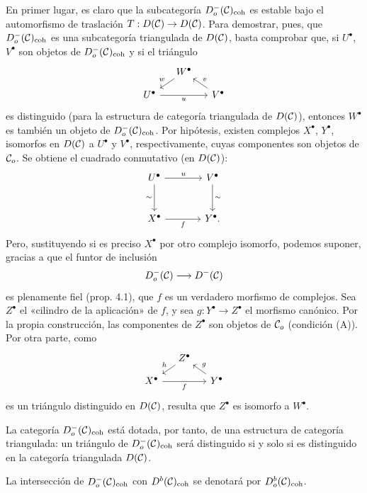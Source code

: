 En primer lugar, es claro que la subcategoría $D_o^-(\mathcal C)_{\mathrm{coh}}$ es estable bajo el automorfismo de traslación $T:D(\mathcal C)\to D(\mathcal C)$. Para demostrar, pues, que $D_o^-(\mathcal C)_{\mathrm{coh}}$ es una subcategoría triangulada de $D(\mathcal C)$, basta comprobar que, si $U^\bullet$, $V^\bullet$ son objetos de $D_o^-(\mathcal C)_{\mathrm{coh}}$ y si el triángulo
\[
\begin{tikzcd}[column sep=small,row sep=small]
& W^\bullet \arrow[dl,"w"']\\
U^\bullet \arrow[rr,"u"']&& V^\bullet \arrow[ul,"v"']
\end{tikzcd}
\]
es distinguido (para la estructura de categoría triangulada de $D(\mathcal C)$), entonces $W^\bullet$ es también un objeto de $D_o^-(\mathcal C)_{\mathrm{coh}}$. Por hipótesis, existen complejos $X^\bullet$, $Y^\bullet$, isomorfos en $D(\mathcal C)$ a $U^\bullet$ y $V^\bullet$, respectivamente, cuyas componentes son objetos de $\mathcal C_o$. Se obtiene el cuadrado conmutativo (en $D(\mathcal C)$):
\[
\begin{tikzcd}[column sep=large,row sep=large]
U^\bullet \arrow[r,"u"] \arrow[d,"\sim"']&V^\bullet \arrow[d,"\sim"]\\
X^\bullet \arrow[r,"f"']&Y^\bullet .
\end{tikzcd}
\]
Pero, sustituyendo si es preciso $X^\bullet$ por otro complejo isomorfo, podemos suponer, gracias a que el funtor de inclusión
\[
D_o^-(\mathcal C)\longrightarrow D^-(\mathcal C)
\]
es plenamente fiel (prop. 4.1), que $f$ es un verdadero morfismo de complejos. Sea $Z^\bullet$ el «cilindro de la aplicación» de $f$, y sea $g:Y^\bullet\to Z^\bullet$ el morfismo canónico. Por la propia construcción, las componentes de $Z^\bullet$ son objetos de $\mathcal C_o$ (condición (A)). Por otra parte, como
\[
\begin{tikzcd}[column sep=small,row sep=small]
&Z^\bullet \arrow[dl,"h"']\\
X^\bullet \arrow[rr,"f"']&&Y^\bullet \arrow[ul,"g"']
\end{tikzcd}
\]
es un triángulo distinguido en $D(\mathcal C)$, resulta que $Z^\bullet$ es isomorfo a $W^\bullet$.

La categoría $D_o^-(\mathcal C)_{\mathrm{coh}}$ está dotada, por tanto, de una estructura de categoría triangulada: un triángulo de $D_o^-(\mathcal C)_{\mathrm{coh}}$ será distinguido si y solo si es distinguido en la categoría triangulada $D(\mathcal C)$.

La intersección de $D_o^-(\mathcal C)_{\mathrm{coh}}$ con $D^b(\mathcal C)_{\mathrm{coh}}$ se denotará por $D_o^b(\mathcal C)_{\mathrm{coh}}$.
